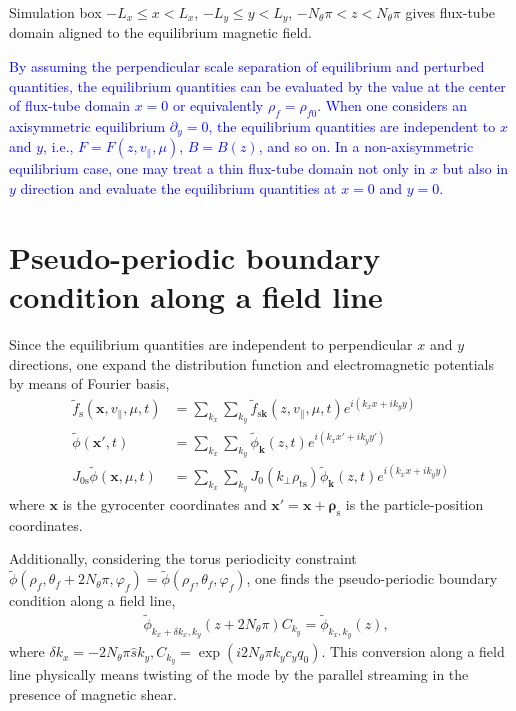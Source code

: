 Simulation box $-L_x \leq x < L_x$, $-L_y \leq y < L_y$, $-N_\theta \pi < z < N_\theta \pi$ gives flux-tube domain aligned to the equilibrium magnetic field. 

\textcolor{blue}{By assuming the perpendicular scale separation of equilibrium and perturbed quantities, the equilibrium quantities can be evaluated by the value at the center of flux-tube domain $x=0$ or equivalently $\rho_f = \rho_{f0}$. When one considers an axisymmetric equilibrium $\partial_y=0$, the equilibrium quantities are independent to $x$ and $y$, i.e., $F = F(z,v_\parallel,\mu)$, $B = B(z)$, and so on. In a non-axisymmetric equilibrium case, one may treat a thin flux-tube domain not only in $x$ but also in $y$ direction and evaluate the equilibrium quantities at $x=0$ and $y=0$.}





\section{Pseudo-periodic boundary condition along a field line}
\label{sec:Pseudo-periodic boundary condition along a field line}
Since the equilibrium quantities are independent to perpendicular $x$ and $y$ directions, one expand the distribution function and electromagnetic potentials by means of Fourier basis,
\begin{align}
  \tilde{f}_\mathrm{s}(\bm{x},v_\parallel,\mu,t) &= \sum_{k_x}\sum_{k_y} \tilde{f}_{\mathrm{s}\bm{k}} (z,v_\parallel,\mu,t) e^{i(k_xx+ik_yy)}\\
  \tilde{\phi}(\bm{x}',t) &= \sum_{k_x}\sum_{k_y} \tilde{\phi}_{\bm{k}} (z,t) e^{i(k_xx'+ik_yy')}\\
  J_{0\mathrm{s}} \tilde{\phi}(\bm{x},\mu,t) &= \sum_{k_x}\sum_{k_y} J_0(k_\perp \rho_{\mathrm{ts}}) \tilde{\phi}_{\bm{k}} (z,t) e^{i(k_xx+ik_yy)}\end{align}
where $\bm{x}$ is the gyrocenter coordinates and $\bm{x}'=\bm{x}+\bm{\rho}_\mathrm{s}$ is the particle-position coordinates.

Additionally, considering the torus periodicity constraint $\tilde{\phi}(\rho_f,\theta_f+2N_\theta\pi,\varphi_f) = \tilde{\phi}(\rho_f,\theta_f,\varphi_f)$, one finds the pseudo-periodic boundary condition along a field line,
\begin{align}
  &\tilde{\phi}_{k_x+\delta k_x,k_y} (z+2N_\theta\pi) C_{k_y} = \tilde{\phi}_{k_x,k_y}(z),
  \label{eq:boundarycondition}
\end{align}
where $\delta k_x = -2N_\theta \pi \hat{s} k_y, C_{k_y} = \exp (i2N_\theta \pi k_y c_y q_0)$. This conversion along a field line physically means twisting of the mode by the parallel streaming in the presence of magnetic shear.





